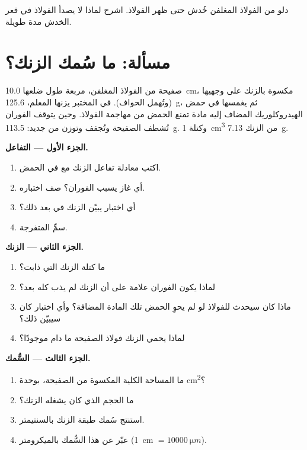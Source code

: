 \begin{exercise}[$\star\star\star$]\label{exo:g9:metals-acids-corrosion:12}
دلو من الفولاذ المغلفن خُدش حتى ظهر الفولاذ. اشرح لماذا لا يصدأ الفولاذ
في قعر الخدش مدة طويلة.
\end{exercise}

\section{مسألة: ما سُمك الزنك؟}

\begin{problem}
\label{pb:g9:metals-acids-corrosion:1}
صفيحة من الفولاذ المغلفن، مربعة طول ضلعها \qty{10.0}{cm}، مكسوة بالزنك
على وجهيها (وتُهمل الحواف). في المختبر يزنها المعلم، \qty{125.6}{g}، ثم
يغمسها في حمض الهيدروكلوريك المضاف إليه مادة تمنع الحمض من مهاجمة الفولاذ.
وحين يتوقف الفوران تُشطف الصفيحة وتُجفف وتوزن من جديد: \qty{113.5}{g}.
وكتلة \qty{1}{cm^3} من الزنك \qty{7.13}{g}.

\medskip
\noindent\textbf{الجزء الأول --- التفاعل.}
\begin{enumerate}
  \item اكتب معادلة تفاعل الزنك مع  
        في الحمض.
  \item أي غاز يسبب الفوران؟ صف اختباره.
  \item أي اختبار يبيّن  الزنك في  بعد ذلك؟
  \item سمِّ  المتفرجة.
\end{enumerate}

\medskip
\noindent\textbf{الجزء الثاني --- الزنك.}
\begin{enumerate}[resume]
  \item ما كتلة الزنك التي ذابت؟
  \item لماذا يكون الفوران علامة على أن الزنك لم يذب كله
        بعد؟
  \item ماذا كان سيحدث للفولاذ لو لم يحوِ الحمض تلك المادة المضافة؟ وأي
        اختبار كان سيبيّن ذلك؟
  \item لماذا يحمي الزنك فولاذ الصفيحة ما دام
        موجودًا؟
\end{enumerate}

\medskip
\noindent\textbf{الجزء الثالث --- السُّمك.}
\begin{enumerate}[resume]
  \item ما المساحة الكلية المكسوة من الصفيحة، بوحدة \unit{cm^2}؟
  \item ما الحجم الذي كان يشغله الزنك؟
  \item استنتج سُمك طبقة الزنك بالسنتيمتر.
  \item عبّر عن هذا السُّمك بالميكرومتر
        (\qty{1}{cm} $= \qty{10000}{\micro m}$).
\end{enumerate}
\end{problem}
